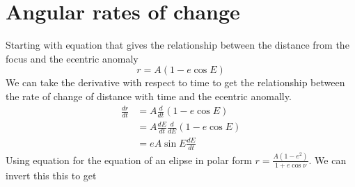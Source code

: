 \section{Angular rates of change}
Starting with equation  that gives the relationship between the distance from the focus and the ecentric anomaly
\begin{equation*}
r=A(1-e\cos E)
\end{equation*}
We can take the derivative with respect to time to get the relationship between the rate of change of distance with time and the ecentric anomally.
\begin{align}
\frac{dr}{dt} &= A \frac{d}{dt}\left(1-e\cos E \right)\nonumber \\
&= A \frac{dE}{dt}\frac{d}{dE}\left(1-e\cos E \right)\nonumber \\
&= eA \sin E \frac{dE}{dt} \label{eq:Kepler1}
\end{align}
Using equation  for the equation of an elipse in polar form $r = \frac{A\left(1-e^2\right)}{ 1+e \cos \nu}$. We can invert this this to get

